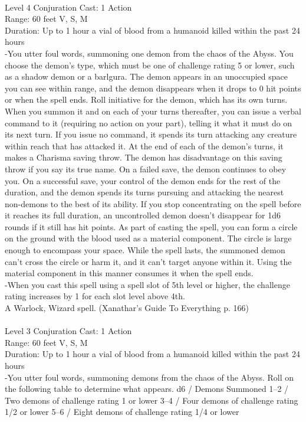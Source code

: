 \documentclass[10pt,twocolumn]{report}
\begin{document}
 \\
Level 4 \quad Conjuration \quad Cast: 1 Action\\
Range: 60 feet \quad V, S, M\\
Duration: Up to 1 hour \quad a vial of blood from a humanoid killed within the past 24 hours\\
-You utter foul words, summoning one demon from the chaos of the Abyss. You choose the demon’s type, which must be one of challenge rating 5 or lower, such as a shadow demon or a barlgura. The demon appears in an unoccupied space you can see within range, and the demon disappears when it drops to 0 hit points or when the spell ends.
Roll initiative for the demon, which has its own turns. When you summon it and on each of your turns thereafter, you can issue a verbal command to it (requiring no action on your part), telling it what it must do on its next turn. If you issue no command, it spends its turn attacking any creature within reach that has attacked it.
At the end of each of the demon’s turns, it makes a Charisma saving throw. The demon has disadvantage on this saving throw if you say its true name. On a failed save, the demon continues to obey you. On a successful save, your control of the demon ends for the rest of the duration, and the demon spends its turns pursuing and attacking the nearest non-demons to the best of its ability. If you stop concentrating on the spell before it reaches its full duration, an uncontrolled demon doesn’t disappear for 1d6 rounds if it still has hit points.
As part of casting the spell, you can form a circle on the ground with the blood used as a material component. The circle is large enough to encompass your space. While the spell lasts, the summoned demon can’t cross the circle or harm it, and it can’t target anyone within it. Using the material component in this manner consumes it when the spell ends.\\
-When you cast this spell using a spell slot of 5th level or higher, the challenge rating increases by 1 for each slot level above 4th.\\
A Warlock, Wizard spell. (Xanathar's Guide To Everything p. 166) \\


 \\
Level 3 \quad Conjuration \quad Cast: 1 Action\\
Range: 60 feet \quad V, S, M\\
Duration: Up to 1 hour \quad a vial of blood from a humanoid killed within the past 24 hours\\
-You utter foul words, summoning demons from the chaos of the Abyss. Roll on the following table to determine what appears.
d6 / Demons Summoned
1–2 / Two demons of challenge rating 1 or lower
3–4 / Four demons of challenge rating 1/2 or lower
5–6 / Eight demons of challenge rating 1/4 or lower
\end{document}
